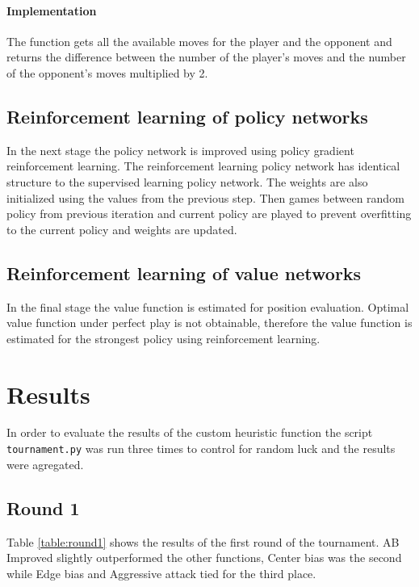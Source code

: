 \documentclass[11pt]{article}
\begin{document}
\paragraph{Implementation}

The function gets all the available moves for the player and the opponent and returns the difference between the number of the player's moves and the number of the opponent's moves multiplied by 2.

\subsection{Reinforcement learning of policy networks}

In the next stage the policy network is improved using policy gradient reinforcement learning. The reinforcement learning policy network has identical structure to the supervised learning policy network. The weights are also initialized using the values from the previous step. Then games between random policy from previous iteration and current policy are played to prevent overfitting to the current policy and weights are updated.

\subsection{Reinforcement learning of value networks}

In the final stage the value function is estimated for position evaluation. Optimal value function under perfect play is not obtainable, therefore the value function is estimated for the strongest policy using reinforcement learning.

\section{Results}

In order to evaluate the results of the custom heuristic function the script \texttt{tournament.py} was run three times to control for random luck and the results were agregated.

\subsection{Round 1}

Table \ref{table:round1} shows the results of the first round of the tournament. AB Improved slightly outperformed the other functions, Center bias was the second while Edge bias and Aggressive attack tied for the third place.
\end{document}
